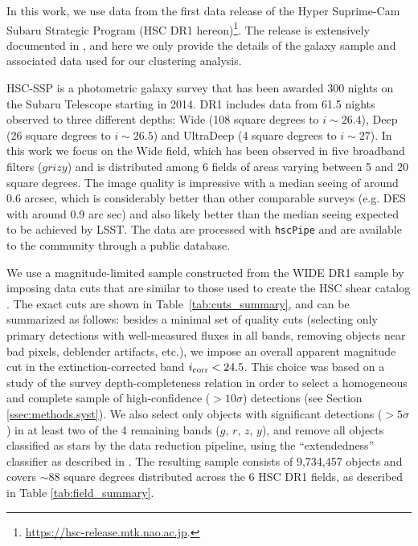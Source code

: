 \documentclass[a4paper,11pt]{article}
\begin{document}
  In this work, we use data from the first data release of the Hyper Suprime-Cam Subaru Strategic Program (HSC DR1 hereon)\footnote{\url{https://hsc-release.mtk.nao.ac.jp}.}. The release is extensively documented in \cite{2018PASJ...70S...8A}, and here we only provide the details of the galaxy sample and associated data used for our clustering analysis.

  HSC-SSP is a photometric galaxy survey that has been awarded 300 nights on the Subaru Telescope starting in 2014. DR1 includes data from 61.5 nights observed to three different depths: Wide (108 square degrees to $i\sim 26.4$), Deep (26 square degrees to $i\sim26.5$) and UltraDeep (4 square degrees to $i\sim 27$). In this work we focus on the Wide field, which has been observed in five broadband filters ($grizy$) and is distributed among 6 fields  of areas varying between 5 and 20 square degrees. The image quality is impressive with a median seeing of around 0.6 arcsec, which is considerably better than other comparable surveys (e.g. DES with around 0.9 arc sec) and also likely better than the median seeing expected to be achieved by LSST. The data are processed with \texttt{hscPipe} \cite{2018PASJ...70S...5B} and are available to the community through a public database.
  
  We use a magnitude-limited sample constructed from the WIDE DR1 sample by imposing data cuts that are similar to those used to create the HSC shear catalog \cite{2018PASJ...70S..25M}. The exact cuts are shown in Table~\ref{tab:cuts_summary}, and can be summarized as follows: besides a minimal set of quality cuts (selecting only primary detections with well-measured fluxes in all bands, removing objects near bad pixels, deblender artifacts, etc.), we impose an overall apparent magnitude cut in the extinction-corrected band $i_{\rm corr}<24.5$. This choice was based on a study of the survey depth-completeness relation in order to select a homogeneous and complete sample of high-confidence ($>10\sigma$) detections (see Section \ref{ssec:methods.syst}). We also select only objects with significant detections ($>5\sigma$) in at least two of the 4 remaining bands ($g,\,r,\,z,\,y$), and remove all objects classified as stars by the data reduction pipeline, using the ``extendedness'' classifier as described in \cite{2018PASJ...70S..25M,2018PASJ...70S...5B}. The resulting sample consists of 9,734,457 objects and covers $\sim88$ square degrees distributed across the 6 HSC DR1 fields, as described in Table \ref{tab:field_summary}.
\end{document}
